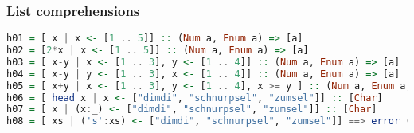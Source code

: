 \hypertarget{list-comprehensions}{%
\subsubsection{List comprehensions}\label{list-comprehensions}}

\begin{lstlisting}[language=Haskell]
h01 = [ x | x <- [1 .. 5]] :: (Num a, Enum a) => [a]
h02 = [2*x | x <- [1 .. 5]] :: (Num a, Enum a) => [a]
h03 = [ x-y | x <- [1 .. 3], y <- [1 .. 4]] :: (Num a, Enum a) => [a]
h04 = [ x-y | y <- [1 .. 3], x <- [1 .. 4]] :: (Num a, Enum a) => [a]
h05 = [ x+y | x <- [1 .. 3], y <- [1 .. 4], x >= y ] :: (Num a, Enum a, Ord a) => [a]
h06 = [ head x | x <- ["dimdi", "schnurpsel", "zumsel"]] :: [Char]
h07 = [ x | (x:_) <- ["dimdi", "schnurpsel", "zumsel"]] :: [Char]
h08 = [ xs | ('s':xs) <- ["dimdi", "schnurpsel", "zumsel"]] ==> error (s unkown)
\end{lstlisting}

